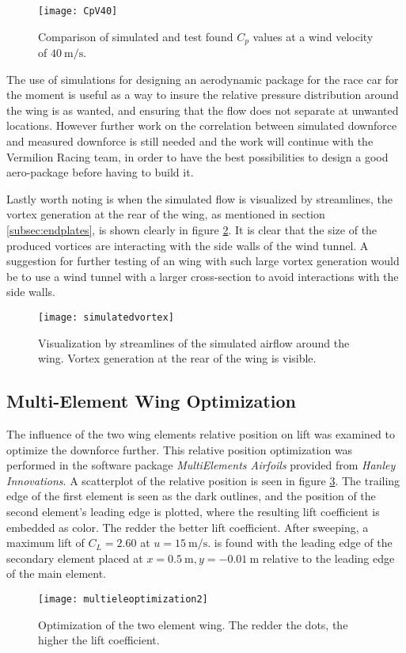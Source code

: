   \begin{figure}
    \texttt{[image: CpV40]}
    \caption{Comparison of simulated and test found $C_p$ values at a wind velocity of $\SI{40}{\metre\per\second}$.}
    \label{fig:CpV40}
  \end{figure}

  The use of simulations for designing an aerodynamic package for the race car for the moment is useful as a way to insure the relative pressure distribution around the wing is as wanted, and ensuring that the flow does not separate at unwanted locations. However further work on the correlation between simulated downforce and measured downforce is still needed and the work will continue with the Vermilion Racing team, in order to have the best possibilities to design a good aero-package before having to build it.

  Lastly worth noting is when the simulated flow is visualized by streamlines, the vortex generation at the rear of the wing, as mentioned in section \ref{subsec:endplates}, is shown clearly in figure \ref{fig:simvortex}. It is clear that the size of the produced vortices are interacting with the side walls of the wind tunnel. A suggestion for further testing of an wing with such large vortex generation would be to use a wind tunnel with a larger cross-section to avoid interactions with the side walls.

  \begin{figure}
    \texttt{[image: simulatedvortex]}
    \caption{Visualization by streamlines of the simulated airflow around the wing. Vortex generation at the rear of the wing is visible.}
    \label{fig:simvortex}
  \end{figure}

  \subsection{Multi-Element Wing Optimization}
  The influence of the two wing elements relative position on lift was examined to optimize the downforce further. This relative position optimization was performed in the software package \emph{MultiElements Airfoils} provided from \emph{Hanley Innovations}. A scatterplot of the relative position is seen in figure \ref{fig:multieleoptimization}. The trailing edge of the first element is seen as the dark outlines, and the position of the second element's leading edge is plotted, where the resulting lift coefficient is embedded as color. The redder the better lift coefficient. After sweeping, a maximum lift of $C_L = 2.60$  at $u = \SI{15}{\metre\per\second}$. is found with the leading edge of the secondary element placed at $x=\SI{0.5}{\metre},y=\SI{-0.01}{\metre}$ relative to the leading edge of the main element.

  \begin{figure}
    \texttt{[image: multieleoptimization2]}
    \caption{Optimization of the two element wing. The redder the dots, the higher the lift coefficient.}
    \label{fig:multieleoptimization}
  \end{figure}

